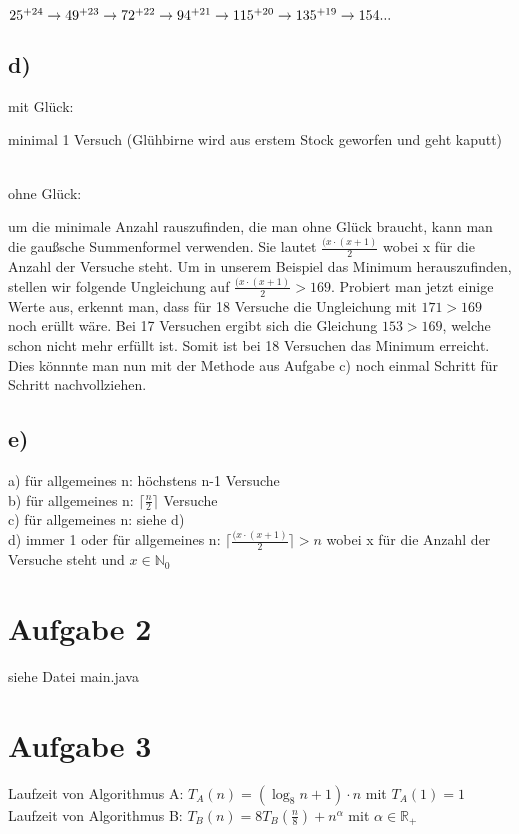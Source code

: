 \documentclass[a4paper]{scrartcl}
\begin{document}
$25 \textsuperscript{+24}\rightarrow 49 \textsuperscript{+23}\rightarrow 72 \textsuperscript{+22}\rightarrow 94 \textsuperscript{+21}\rightarrow 115 \textsuperscript{+20}\rightarrow 135 \textsuperscript{+19}\rightarrow 154... $ 
\subsection*{d)}
\begin{bfseries} mit Glück: \end{bfseries} minimal 1 Versuch (Glühbirne wird aus erstem Stock geworfen und geht kaputt)
\\
\\
\begin{bfseries} ohne Glück:\end{bfseries} um die minimale Anzahl rauszufinden, die man ohne Glück braucht, kann man die gaußsche Summenformel verwenden. Sie lautet $\frac{(x \cdot (x+1)}{2}$ wobei x für die Anzahl der Versuche steht. Um in unserem Beispiel das Minimum herauszufinden, stellen wir folgende Ungleichung auf $\frac{(x \cdot (x+1)}{2} > 169$. Probiert man jetzt einige Werte aus, erkennt man, dass für 18 Versuche die Ungleichung mit $171 > 169$ noch erüllt wäre. Bei 17 Versuchen ergibt sich die Gleichung $ 153 > 169$, welche schon nicht mehr erfüllt ist. Somit ist bei 18 Versuchen das Minimum erreicht. Dies könnnte man nun mit der Methode aus Aufgabe c) noch einmal Schritt für Schritt nachvollziehen.
\subsection*{e)}
a) für allgemeines n: höchstens n-1 Versuche
\\
b) für allgemeines n: $ \lceil \frac{n}{2} \rceil$ Versuche
\\
c) für allgemeines n: siehe d)
\\
d) immer 1 oder für allgemeines n:  $\lceil \frac{(x \cdot (x+1)}{2}\rceil > n$ wobei x für die Anzahl der Versuche steht und $x \in \mathbb{N}_0$

\section*{Aufgabe 2}
siehe Datei main.java

\section*{Aufgabe 3}
Laufzeit von Algorithmus A: $T_A(n)=(\log_{8}n+1)\cdot n$ mit $T_A(1)=1$\\
Laufzeit von Algorithmus B: $T_B(n)=8T_B(\frac{n}{8})+n^{\alpha}$ mit $\alpha \in \mathbb{R}_+$
\end{document}
